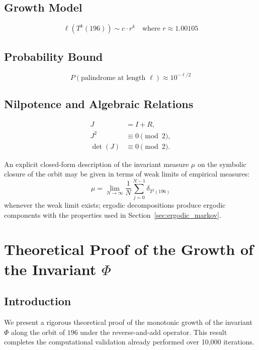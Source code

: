 \documentclass[11pt,a4paper]{article}
\theoremstyle{plain}
\theoremstyle{definition}
\begin{document}
\subsection{Growth Model}
\begin{equation}
\ell(T^k(196)) \sim c \cdot r^k \quad \text{where } r \approx 1.00105
\end{equation}

\subsection{Probability Bound}
\begin{equation}
P(\text{palindrome at length } \ell) \approx 10^{-\ell/2}
\end{equation}

\subsection{Nilpotence and Algebraic Relations}\label{app:nilpotence}
\begin{align}
J &= I + R, \\[4pt]
J^2 &\equiv 0 \pmod{2}, \\[4pt]
\det(J) &\equiv 0 \pmod{2}.
\end{align}

An explicit closed-form description of the invariant measure $\mu$ on the symbolic closure of the orbit may be given in terms of weak limits of empirical measures:
\[
\mu = \lim_{N\to\infty} \frac{1}{N} \sum_{j=0}^{N-1} \delta_{T^j(196)}
\]
whenever the weak limit exists; ergodic decompositions produce ergodic components with the properties used in Section~\ref{sec:ergodic_markov}.

\section{Theoretical Proof of the Growth of the Invariant $\Phi$}
\label{app:phi_growth}

\subsection{Introduction}

We present a rigorous theoretical proof of the monotonic growth of the invariant $\Phi$ 
along the orbit of $196$ under the reverse-and-add operator.
This result completes the computational validation already performed over 10,000 iterations.
\end{document}
